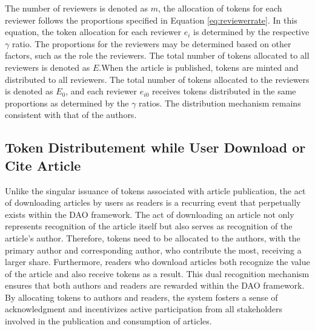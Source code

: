 \documentclass[lettersize,journal]{IEEEtran}
\begin{document}
The number of reviewers is denoted as $m$, the allocation of tokens for each reviewer follows the proportions specified in Equation \ref{eq:reviewerrate}. In this equation, the token allocation for each reviewer $e_i$ is determined by the respective $\gamma$ ratio. The proportions for the reviewers may be determined based on other factors, such as the role the reviewers. The total number of tokens allocated to all reviewers is denoted as $E$.When the article is published, tokens are minted and distributed to all reviewers. The total number of tokens allocated to the reviewers is denoted as $E_0$, and each reviewer $e_{i0}$ receives tokens distributed in the same proportions as determined by the $\gamma$ ratios. The distribution mechanism remains consistent with that of the authors.

\subsection{Token Distributement while User Download or Cite Article}

Unlike the singular issuance of tokens associated with article publication, the act of downloading articles by users as readers is a recurring event that perpetually exists within the DAO framework. The act of downloading an article not only represents recognition of the article itself but also serves as recognition of the article's author. Therefore, tokens need to be allocated to the authors, with the primary author and corresponding author, who contribute the most, receiving a larger share.
Furthermore, readers who download articles both recognize the value of the article and also receive tokens as a result. This dual recognition mechanism ensures that both authors and readers are rewarded within the DAO framework. By allocating tokens to authors and readers, the system fosters a sense of acknowledgment and incentivizes active participation from all stakeholders involved in the publication and consumption of articles.
\end{document}
